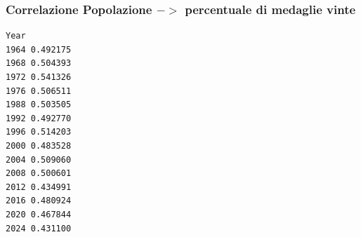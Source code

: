 \subsubsection*{Correlazione Popolazione $->$ percentuale di medaglie vinte}
\begin{verbatim}
Year
1964 0.492175
1968 0.504393
1972 0.541326
1976 0.506511
1988 0.503505
1992 0.492770
1996 0.514203
2000 0.483528
2004 0.509060
2008 0.500601
2012 0.434991
2016 0.480924
2020 0.467844
2024 0.431100
\end{verbatim}
